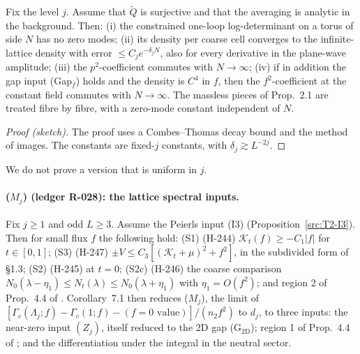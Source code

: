 \begin{proposition}\label{src:T2-G2}
Fix the level $j$. Assume that $\tilde Q$ is surjective and that the averaging is analytic in the background. Then:
(i) the constrained one-loop log-determinant on a torus of side $N$ has no zero modes;
(ii) its density per coarse cell converges to the infinite-lattice density with error $\le C_je^{-\delta_jN}$, also for every derivative in the plane-wave amplitude;
(iii) the $p^2$-coefficient commutes with $N\to\infty$;
(iv) if in addition the gap input (Gap$_f$) holds and the density is $C^4$ in $f$, then the $f^2$-coefficient at the constant field commutes with $N\to\infty$.
The massless pieces of Prop.~2.1 are treated fibre by fibre, with a zero-mode constant independent of $N$.
\end{proposition}

\begin{proof}[Proof (sketch)]
The proof uses a Combes--Thomas decay bound and the method of images. The constants are fixed-$j$ constants, with $\delta_j\gtrsim L^{-2j}$.
\end{proof}

We do not prove a version that is uniform in $j$.

\paragraph{($M_j$) (ledger R-028): the lattice spectral inputs.}

\begin{proposition}\label{src:T2-S123}
Fix $j\ge1$ and odd $L\ge3$. Assume the Peierls input (I3) (Proposition~\ref{src:T2-I3}). Then for small flux $f$ the following hold:
(S1) (H-244) $\mathcal K_t(f)\ge-C_1|f|$ for $t\in[0,1]$;
(S3) (H-247) $\pm V\le C_3[(\mathcal K_t+\mu)^2+f^2]$, in the subdivided form of  \S1.3;
(S2) (H-245) at $t=0$;
(S2c) (H-246) the coarse comparison $N_0(\lambda-\eta_1)\le N_t(\lambda)\le N_0(\lambda+\eta_1)$ with $\eta_1=O(f^2)$;
and region 2 of Prop.~4.4 of . Corollary~7.1 then reduces ($M_j$), the limit of $[\Gamma_c(\Lambda_j;f)-\Gamma_c(1;f)-(f=0\text{ value})]/(n_2f^2)$ to $d_j$, to three inputs: the near-zero input $(Z_j)$, itself reduced to the 2D gap (G$_{\mathrm{2D}}$); region 1 of Prop.~4.4 of ; and the differentiation under the integral in the neutral sector.
\end{proposition}

